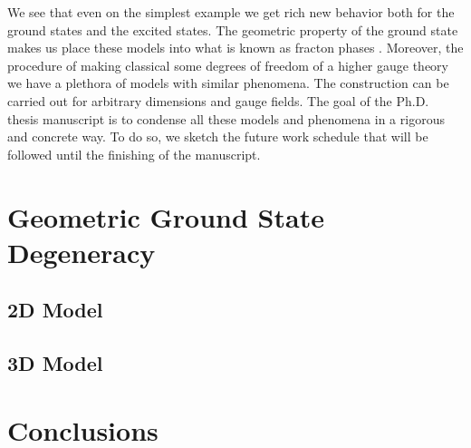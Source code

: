 \documentclass[%
nofootinbib,
 amsmath,amssymb,
aps,
]{revtex4-1}
\theoremstyle{plain}%
\theoremstyle{definition}
\theoremstyle{remark}
\begin{document}
We see that even on the simplest example we get rich new behavior both for the ground states and the excited states. The geometric property of the ground state makes us place these models into what is known as fracton phases \cite{chamon05,rahul18}. Moreover, the procedure of making classical some degrees of freedom  of a higher gauge theory we have a plethora of models with similar phenomena. The construction can be carried out for arbitrary dimensions and gauge fields. The goal of the Ph.D. thesis manuscript is to condense all these models and phenomena in a rigorous and concrete way. To do so, we sketch the future work schedule that will be followed until the finishing of the manuscript.

 
\section{Geometric Ground State Degeneracy}\label{sec:G-GSD}
\subsection{2D Model}
\subsection{3D Model}

\section{Conclusions}\label{sec:Remarks}

\appendix
\end{document}
